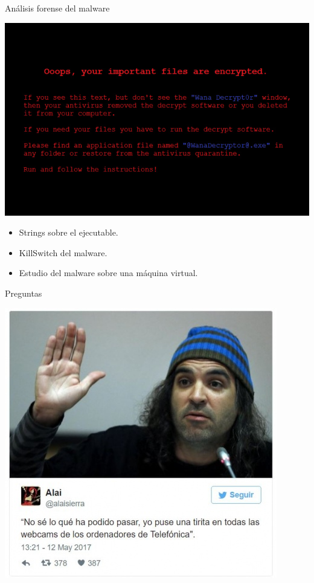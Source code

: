\documentclass[10pt]{beamer}
\begin{document}
\begin{frame}{Análisis forense del malware}
	\pause
	\begin{center}
		\includegraphics[scale=0.25]{./Imagenes/wannacry-3.jpg}
	\end{center}
	\pause
	\begin{itemize}
		\item Strings sobre el ejecutable.
		\pause
		\item KillSwitch del malware.
		\pause
		\item Estudio del malware sobre una máquina virtual.
	\end{itemize}
\end{frame}

\begin{frame}[standout]{Preguntas}
	\begin{center}
		\includegraphics[scale=0.45]{./Imagenes/chema-alonso.jpg}
	\end{center}
\end{frame}
\end{document}

